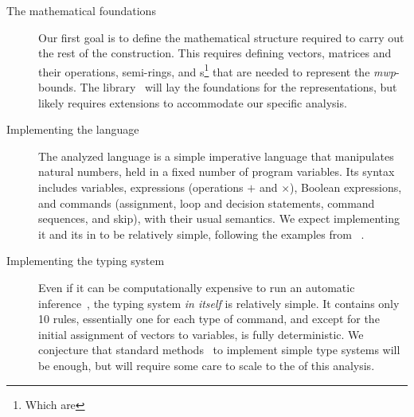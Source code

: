 \begin{description}

\item[The mathematical foundations]
Our first goal is to define the mathematical structure required to carry out the
rest of the construction. This requires defining vectors, matrices and their
operations, semi-rings, and s\footnote{Which are
} that are needed to represent the
\emph{mwp}-bounds. The 
library~\cite{mahboubi2022,mathcomp} will lay the foundations for the
 representations, but likely requires extensions to
accommodate our specific analysis.

\item[Implementing the language]
The analyzed language is a simple imperative language that manipulates natural
numbers, held in a fixed number of program variables. Its syntax includes
variables, expressions (operations \(+\) and \(\times\)), Boolean expressions,
and commands (\eg  assignment, loop and decision statements, command sequences,
and skip), with their usual semantics. We expect implementing it and its
 in  to be relatively simple, following the
examples from ~\cite{cpierce20221,cpierce20222}.

\item[Implementing the typing system]
Even if it can be computationally expensive to run an automatic
inference~\cite{aubert2023b}, the typing system \emph{in
itself} is relatively simple. It contains only 10 rules, essentially one for
each type of command, and except for the initial assignment of vectors to
variables, is fully deterministic. We conjecture that standard
methods~\cite{chlipala2022, chlipala2010} to implement simple type systems will
be enough, but will require some care to scale to the  of this analysis.


\end{description}
